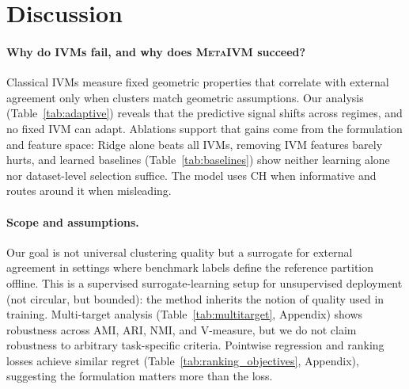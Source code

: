 \documentclass[10pt]{article} %
\newcommand{\ours}{\textsc{MetaIVM}}
\begin{document}
\section{Discussion}
\label{sec:discussion}

\paragraph{Why do IVMs fail, and why does \ours{} succeed?} Classical IVMs measure fixed geometric properties that correlate with external agreement only when clusters match geometric assumptions. Our analysis (Table~\ref{tab:adaptive}) reveals that the predictive signal shifts across regimes, and no fixed IVM can adapt. Ablations support that gains come from the formulation and feature space: Ridge alone beats all IVMs, removing IVM features barely hurts, and learned baselines (Table~\ref{tab:baselines}) show neither learning alone nor dataset-level selection suffice. The model uses CH when informative and routes around it when misleading.

\paragraph{Scope and assumptions.} Our goal is not universal clustering quality but a surrogate for external agreement in settings where benchmark labels define the reference partition offline. This is a supervised surrogate-learning setup for unsupervised deployment (not circular, but bounded): the method inherits the notion of quality used in training. Multi-target analysis (Table~\ref{tab:multitarget}, Appendix) shows robustness across AMI, ARI, NMI, and V-measure, but we do not claim robustness to arbitrary task-specific criteria. Pointwise regression and ranking losses achieve similar regret (Table~\ref{tab:ranking_objectives}, Appendix), suggesting the formulation matters more than the loss.
\end{document}
